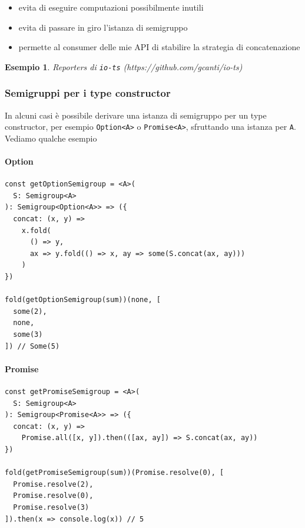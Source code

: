 \documentclass[12pt]{article}
\newtheorem{example}{Esempio}
\begin{document}
\begin{itemize}
  \item evita di eseguire computazioni possibilmente inutili
  \item evita di passare in giro l'istanza di semigruppo
  \item permette al consumer delle mie API di stabilire la strategia di concatenazione
\end{itemize}

\begin{example}
Reporters di \texttt{io-ts} (https://github.com/gcanti/io-ts)
\end{example}

\subsubsection{Semigruppi per i type constructor}

In alcuni casi è possibile derivare una istanza di semigruppo per un type constructor, per esempio \texttt{Option<A>} o \texttt{Promise<A>},
sfruttando una istanza per \texttt{A}. Vediamo qualche esempio

\paragraph{Option}

\begin{verbatim}
const getOptionSemigroup = <A>(
  S: Semigroup<A>
): Semigroup<Option<A>> => ({
  concat: (x, y) =>
    x.fold(
      () => y,
      ax => y.fold(() => x, ay => some(S.concat(ax, ay)))
    )
})

fold(getOptionSemigroup(sum))(none, [
  some(2),
  none,
  some(3)
]) // Some(5)
\end{verbatim}

\paragraph{Promise}

\begin{verbatim}
const getPromiseSemigroup = <A>(
  S: Semigroup<A>
): Semigroup<Promise<A>> => ({
  concat: (x, y) =>
    Promise.all([x, y]).then(([ax, ay]) => S.concat(ax, ay))
})

fold(getPromiseSemigroup(sum))(Promise.resolve(0), [
  Promise.resolve(2),
  Promise.resolve(0),
  Promise.resolve(3)
]).then(x => console.log(x)) // 5
\end{verbatim}
\end{document}
